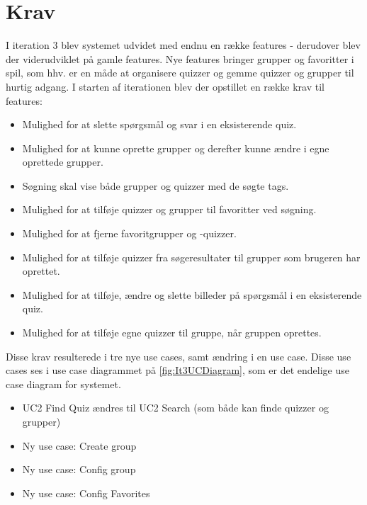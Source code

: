 \section{Krav}

I iteration 3 blev systemet udvidet med endnu en række features - derudover blev der viderudviklet på gamle features. Nye features bringer grupper og favoritter i spil, som hhv. er en måde at organisere quizzer og gemme quizzer og grupper til hurtig adgang.
I starten af iterationen blev der opstillet en række krav til features:

\begin{itemize}
	\item Mulighed for at slette spørgsmål og svar i en eksisterende quiz.
	\item Mulighed for at kunne oprette grupper og derefter kunne ændre i egne oprettede grupper.
	\item Søgning skal vise både grupper og quizzer med de søgte tags.
	\item Mulighed for at tilføje quizzer og grupper til favoritter ved søgning.
	\item Mulighed for at fjerne favoritgrupper og -quizzer.
	\item Mulighed for at tilføje quizzer fra søgeresultater til grupper som brugeren har oprettet.
	\item Mulighed for at tilføje, ændre og slette billeder på spørgsmål i en eksisterende quiz.
	\item Mulighed for at tilføje egne quizzer til gruppe, når gruppen oprettes.
\end{itemize}

Disse krav resulterede i tre nye use cases, samt ændring i en use case. Disse use cases ses i use case diagrammet på \ref{fig:It3UCDiagram}, som er det endelige use case diagram for systemet.

\begin{itemize}
	\item UC2 Find Quiz ændres til UC2 Search (som både kan finde quizzer og grupper)
	\item Ny use case: Create group
	\item Ny use case: Config group
	\item Ny use case: Config Favorites
\end{itemize}

